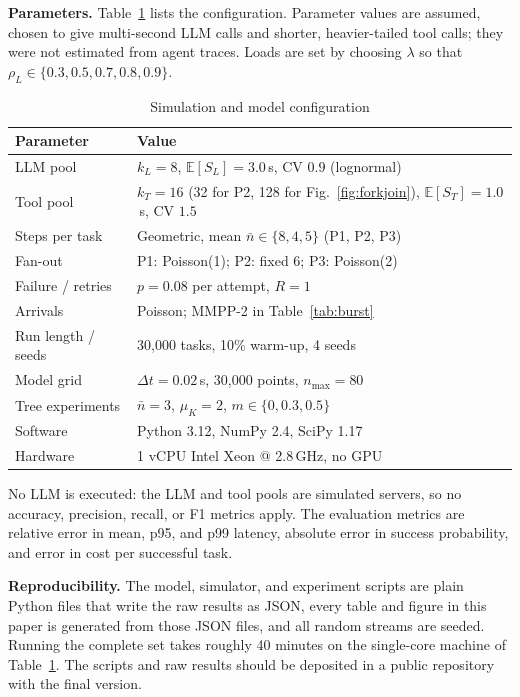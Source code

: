 \documentclass[journal]{IEEEtran}
\newcommand{\E}{\mathbb{E}}
\begin{document}
\textbf{Parameters.} Table~\ref{tab:params} lists the configuration. Parameter values are assumed, chosen to give multi-second LLM calls and shorter, heavier-tailed tool calls; they were not estimated from agent traces. Loads are set by choosing $\lambda$ so that $\rho_L\in\{0.3,0.5,0.7,0.8,0.9\}$.
\begin{table}[t]
\caption{Simulation and model configuration}
\label{tab:params}
\centering
\footnotesize
\setlength{\tabcolsep}{4pt}
\begin{tabular}{lp{2.3in}}
\toprule
Parameter & Value \\
\midrule
LLM pool & $k_L{=}8$, $\E[S_L]{=}3.0$\,s, CV $0.9$ (lognormal) \\
Tool pool & $k_T{=}16$ (32 for P2, 128 for Fig.~\ref{fig:forkjoin}), $\E[S_T]{=}1.0$\,s, CV $1.5$ \\
Steps per task & Geometric, mean $\bar n\in\{8,4,5\}$ (P1, P2, P3) \\
Fan-out & P1: Poisson(1); P2: fixed 6; P3: Poisson(2) \\
Failure / retries & $p=0.08$ per attempt, $R=1$ \\
Arrivals & Poisson; MMPP-2 in Table~\ref{tab:burst} \\
Run length / seeds & 30{,}000 tasks, 10\% warm-up, 4 seeds \\
Model grid & $\Delta t{=}0.02$\,s, 30{,}000 points, $n_{\max}{=}80$ \\
Tree experiments & $\bar n{=}3$, $\mu_K{=}2$, $m\in\{0,0.3,0.5\}$ \\
Software & Python 3.12, NumPy 2.4, SciPy 1.17 \\
Hardware & 1 vCPU Intel Xeon @ 2.8\,GHz, no GPU \\
\bottomrule
\end{tabular}
\end{table}
No LLM is executed: the LLM and tool pools are simulated servers, so no accuracy, precision, recall, or F1 metrics apply. The evaluation metrics are relative error in mean, p95, and p99 latency, absolute error in success probability, and error in cost per successful task.

\textbf{Reproducibility.} The model, simulator, and experiment scripts are plain Python files that write the raw results as JSON, every table and figure in this paper is generated from those JSON files, and all random streams are seeded. Running the complete set takes roughly 40 minutes on the single-core machine of Table~\ref{tab:params}. The scripts and raw results should be deposited in a public repository with the final version.
\end{document}
